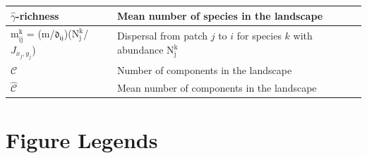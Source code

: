 \documentclass[12pt]{article}
\begin{document}
\begin{table}[h]
\begin{tabular}{  p{5cm}  |  p{10cm} }
  $\hat{\gamma}$-richness & Mean number of species in the landscape \\ \hline
  $\mathrm{m^{k}_{ij}}$ = ($\mathrm{m}$/$\mathfrak{d_{ij}}$)($\mathrm{N^{k}_{j}}$/$J_{x_j,y_j}$) & Dispersal from patch $j$ to $i$ for species $k$ with abundance $\mathrm{N^{k}_{j}}$ \\ \hline
  $\mathcal{C}$ & Number of components in the landscape \\ \hline
  $\hat{\mathcal{C}}$ & Mean number of components in the landscape  \\ \hline
\end{tabular}
\label{table2}
\end{table}

\vspace{5 in}
\newpage

\section*{Figure Legends}
\end{document}
